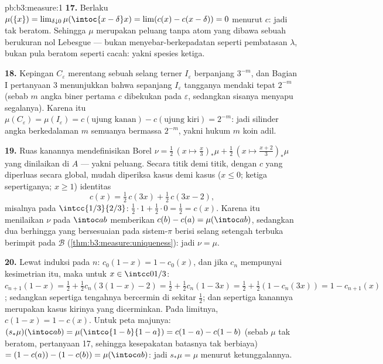 \begin{solution}{pb:b3:measure:1}
\textbf{17.} Berlaku $\mu(\{x\}) = \lim_{\delta\downarrow0}
\mu(\intoc{x-\delta}x) = \lim(c(x) - c(x-\delta)) = 0$ menurut
 $c$: jadi tak beratom. Sehingga $\mu$ merupakan 
peluang tanpa atom yang dibawa sebuah  berukuran nol Lebesgue ---
bukan menyebar-berkepadatan seperti pembatasan $\lambda$,
bukan pula beratom seperti  cacah: yakni spesies ketiga.

\textbf{18.} Kepingan $C_\varepsilon$ merentang sebuah selang
terner $I_\varepsilon$ berpanjang $3^{-m}$, dan Bagian I
pertanyaan 3 menunjukkan bahwa sepanjang $I_\varepsilon$ tangganya
mendaki tepat $2^{-m}$ (sebab $m$ angka biner pertama $c$
dibekukan pada $\varepsilon$, sedangkan sisanya menyapu segalanya).
Karena itu $\mu(C_\varepsilon) = \mu(I_\varepsilon) =
c(\text{ujung kanan}) - c(\text{ujung kiri}) = 2^{-m}$: jadi
silinder angka berkedalaman $m$ semuanya bermassa $2^{-m}$, yakni hukum $m$ koin
adil.

\textbf{19.} Ruas kanannya mendefinisikan  Borel
$\nu = \frac12\,(x \mapsto \tfrac x3)_*\mu + \frac12\,(x
\mapsto \tfrac{x+2}3)_*\mu$ yang dinilaikan di $A$ --- yakni 
peluang. Secara titik demi titik, dengan $c$ yang diperluas secara global, mudah diperiksa
kasus demi kasus ($x \leq 0$; ketiga sepertiganya; $x \geq 1$)
identitas
\[
c(x) = \tfrac12\,c(3x) + \tfrac12\,c(3x - 2),
\]
misalnya pada $\intcc{1/3}{2/3}$: $\frac12\cdot1 + \frac12\cdot0 =
\frac12 = c(x)$. Karena itu menilaikan $\nu$ pada $\intoc ab$
memberikan $c(b) - c(a) = \mu(\intoc ab)$, sedangkan dua  berhingga
yang bersesuaian pada sistem-$\pi$ berisi selang setengah terbuka berimpit
pada $\mathcal B$ (\cref{thm:b3:measure:uniqueness}): jadi $\nu =
\mu$.

\textbf{20.} Lewat induksi pada $n$: $c_0(1-x) = 1 - c_0(x)$,
dan jika $c_n$ mempunyai kesimetrian itu, maka untuk $x \in
\intcc0{1/3}$: $c_{n+1}(1 - x) = \frac12 + \frac12c_n(3(1-x)
- 2) = \frac12 + \frac12c_n(1 - 3x) = \frac12 + \frac12(1 -
c_n(3x)) = 1 - c_{n+1}(x)$; sedangkan sepertiga tengahnya bercermin di sekitar
$\frac12$; dan sepertiga kanannya merupakan kasus kirinya yang dicerminkan. Pada
limitnya, $c(1-x) = 1 - c(x)$. Untuk peta majunya: $(s_*\mu)(\intoc ab)
= \mu(\intco{1-b}{1-a}) = c(1-a) - c(1-b)$ (sebab $\mu$ tak beratom,
pertanyaan 17, sehingga kesepakatan batasnya tak berbiaya) $= (1 -
c(a)) - (1 - c(b)) = \mu(\intoc ab)$: jadi $s_*\mu = \mu$ menurut
ketunggalannya.


\end{solution}
